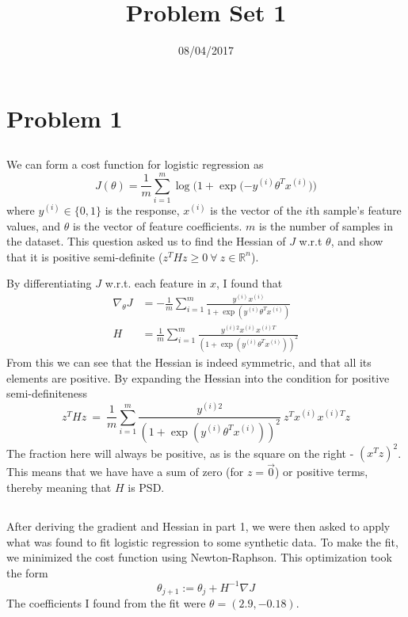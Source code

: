\documentclass[11pt]{article} %
\title{Problem Set 1}
\date{08/04/2017} %
\begin{document}
\maketitle

\section{Problem 1}

\subsection{}
We can form a cost function for logistic regression as 
\[
	J(\theta) = \frac{1}{m}\sum_{i = 1}^{m} \log{\big(1 + \exp{(-y^{(i)}\theta^Tx^{(i)}})}\big)
\]
where $y^{(i)} \in \{0, 1\}$ is the response, $x^{(i)}$ is the vector of the $i$th sample's feature values, and $\theta$ is the vector of feature coefficients. $m$ is the number of samples in the dataset. This question asked us to find the Hessian of $J$ w.r.t $\theta$, and show that it is positive semi-definite ($z^THz \geq 0 \ \forall \ z \in \mathbb{R}^n$).
\par
By differentiating $J$ w.r.t. each feature in $x$, I found that
\begin{equation}
\begin{split}
	\nabla_{\theta}J &= -\frac{1}{m}\sum_{i = 1}^{m}\frac{y^{(i)}x^{(i)}}{1 + \exp{(y^{(i)}\theta^Tx^{(i)})}} \\
	H &=\frac{1}{m}\sum_{i = 1}^{m}\frac{y^{(i) 2} x^{(i)} x^{(i) T}}{(1 + \exp{(y^{(i)}\theta^Tx^{(i)})})^2}
\end{split}
\end{equation}
From this we can see that the Hessian is indeed symmetric, and that all its elements are positive. By expanding the Hessian into the condition for positive semi-definiteness
\[
	z^THz \ = \  \frac{1}{m}\sum_{i = 1}^{m}\frac{y^{(i) 2}} {(1 + \exp{(y^{(i)}\theta^Tx^{(i)})})^2}  \
					z^T x^{(i)}x^{(i) T} z
\]
The fraction here will always be positive, as is the square on the right - $(x^T z)^2$. This means that we have have a sum of zero (for $z = \vec{0}$) or positive terms, thereby meaning that $H$ is PSD.

\subsection{}
After deriving the gradient and Hessian in part 1, we were then asked to apply what was found to fit logistic regression to some synthetic data. To make the fit, we minimized the cost function using Newton-Raphson. This optimization took the form
\[
	\theta_{j+1} := \theta_j + H^{-1} \nabla J
\] 
The coefficients I found from the fit were $\theta = (2.9, -0.18)$.
\end{document}
